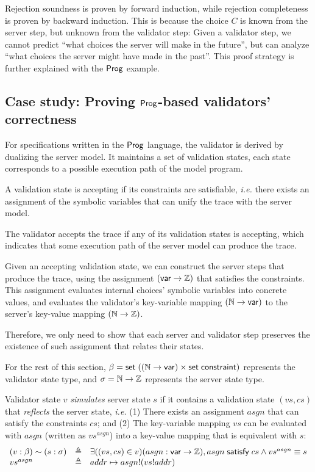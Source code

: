 Rejection soundness is proven by forward induction, while rejection completeness
is proven by backward induction.  This is because the choice $C$ is known from
the server step, but unknown from the validator step: Given a validator step, we
cannot predict ``what choices the server will make in the future'', but can
analyze ``what choices the server might have made in the past''.  This proof
strategy is further explained with the $\mathsf{Prog}$ example.

\subsection{Case study: Proving $\mathsf{Prog}$-based validators' correctness}
For specifications written in the $\mathsf{Prog}$ language, the validator is derived by
dualizing the server model.  It maintains a set of validation states, each state
corresponds to a possible execution path of the model program.

A validation state is accepting if its constraints are satisfiable, {\it i.e.}
there exists an assignment of the symbolic variables that can unify the trace
with the server model.

The validator accepts the trace if any of its validation states is accepting,
which indicates that some execution path of the server model can produce the
trace.

Given an accepting validation state, we can construct the server steps that
produce the trace, using the assignment $(\mathsf{var}\to\mathbb Z)$ that satisfies the
constraints.  This assignment evaluates internal choices' symbolic variables
into concrete values, and evaluates the validator's key-variable mapping
$(\mathbb N\to\mathsf{var})$ to the server's key-value mapping $(\mathbb N\to\mathbb Z)$.

Therefore, we only need to show that each server and validator step preserves
the existence of such assignment that relates their states.

For the rest of this section, $\beta=\mathsf{set}\;((\mathbb N\to\mathsf{var})\times\mathsf{set}\;\mathsf{constraint})$
represents the validator state type, and $\sigma=\mathbb N\to\mathbb Z$ represents the
server state type.

\begin{definition}
  Validator state $v$ {\em simulates} server state $s$ if it contains a
  validation state $(vs,cs)$ that {\em reflects} the server state, {\it i.e.}
  (1) There exists an assignment $asgn$ that can satisfy the constraints $cs$;
  and (2) The key-variable mapping $vs$ can be evaluated with $asgn$ (written as
  $vs^{asgn}$) into a key-value mapping that is equivalent with
  $s$:
  \[\begin{array}{lll} (v:\beta)\sim (s:\sigma)&\triangleq&
  \exists((vs,cs)\in v)(asgn:\mathsf{var}\to\mathbb Z),asgn\;\mathsf{satisfy}\;cs\wedge vs^{asgn}\equiv s\\
  vs^{asgn}&\triangleq&addr\mapsto asgn!(vs!addr) \end{array}\]
\end{definition}

